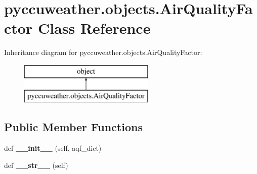 \hypertarget{classpyccuweather_1_1objects_1_1_air_quality_factor}{}\section{pyccuweather.\+objects.\+Air\+Quality\+Factor Class Reference}
\label{classpyccuweather_1_1objects_1_1_air_quality_factor}
Inheritance diagram for pyccuweather.\+objects.\+Air\+Quality\+Factor\+:\begin{figure}[H]
\begin{center}
\leavevmode
\includegraphics[height=2.000000cm]{classpyccuweather_1_1objects_1_1_air_quality_factor}
\end{center}
\end{figure}
\subsection*{Public Member Functions}
\begin{DoxyCompactItemize}
\item 
\hypertarget{classpyccuweather_1_1objects_1_1_air_quality_factor_a4834573080320fa3126146e47dc019e2}{}def {\bfseries \+\_\+\+\_\+init\+\_\+\+\_\+} (self, aqf\+\_\+dict)\label{classpyccuweather_1_1objects_1_1_air_quality_factor_a4834573080320fa3126146e47dc019e2}

\item 
\hypertarget{classpyccuweather_1_1objects_1_1_air_quality_factor_aac494b7df4807a2f87aa09e2f516dc7b}{}def {\bfseries \+\_\+\+\_\+str\+\_\+\+\_\+} (self)\label{classpyccuweather_1_1objects_1_1_air_quality_factor_aac494b7df4807a2f87aa09e2f516dc7b}

\end{DoxyCompactItemize}
